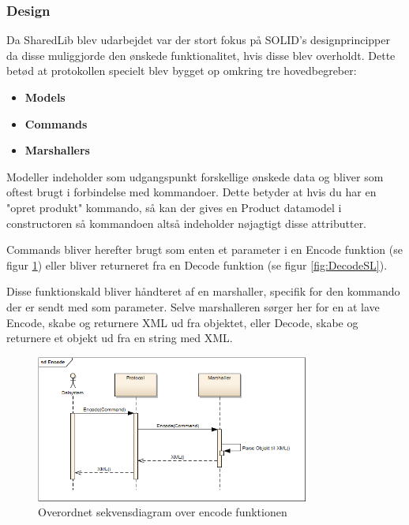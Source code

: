 \subsubsection{Design}
Da SharedLib blev udarbejdet var der stort fokus på SOLID's designprincipper da disse muliggjorde den ønskede funktionalitet, hvis disse blev overholdt. Dette betød at protokollen specielt blev bygget op omkring tre hovedbegreber:

\begin{itemize}
	\item \textbf{Models}
	\item \textbf{Commands} 
	\item \textbf{Marshallers}
\end{itemize}





Modeller indeholder som udgangspunkt forskellige ønskede data og bliver som oftest brugt i forbindelse med kommandoer. Dette betyder at hvis du har en "opret produkt" kommando, så kan der gives en Product datamodel i constructoren så kommandoen altså indeholder nøjagtigt disse attributter. 

Commands bliver herefter brugt som enten et parameter i en Encode funktion (se figur \ref{fig:EncodeSL}) eller bliver returneret fra en Decode funktion (se figur \ref{fig:DecodeSL}). 

Disse funktionskald bliver håndteret af en marshaller, specifik for den kommando der er sendt med som parameter. Selve marshalleren sørger her for en at lave Encode, skabe og returnere XML ud fra objektet, eller Decode, skabe og returnere et objekt ud fra en string med XML.

\begin{figure}[H]
	\centering
	\includegraphics[width=0.8\textwidth]{Projektbeskrivelse/DesignOgImplementering/SharedLib/Images/Rapport/Encode.png}
	\caption{Overordnet sekvensdiagram over encode funktionen}
	\label{fig:EncodeSL}
\end{figure}

